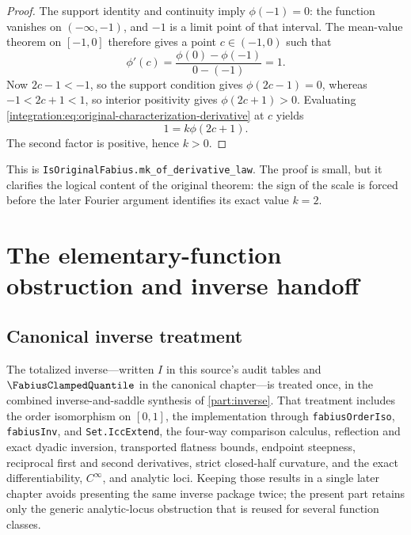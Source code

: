 \documentclass[11pt,oneside]{article}
\theoremstyle{definition}
\theoremstyle{remark}
\newcommand{\lean}[1]{%
  \ifmmode\text{\texttt{\detokenize{#1}}}\else\nolinkurl{#1}\fi}
\begin{document}
\begin{proof}
The support identity and continuity imply $\phi(-1)=0$: the function vanishes on
$(-\infty,-1)$, and $-1$ is a limit point of that interval.  The mean-value theorem on
$[-1,0]$ therefore gives a point $c\in(-1,0)$ such that
\begin{equation}
 \phi'(c)=\frac{\phi(0)-\phi(-1)}{0-(-1)}=1.
 \label{integration:eq:original-characterization-mvt}
\end{equation}
Now $2c-1<-1$, so the support condition gives $\phi(2c-1)=0$, whereas
$-1<2c+1<1$, so interior positivity gives $\phi(2c+1)>0$.  Evaluating
\eqref{integration:eq:original-characterization-derivative} at $c$ yields
\begin{equation}
 1=k\phi(2c+1).
 \label{integration:eq:original-characterization-positive-product}
\end{equation}
The second factor is positive, hence $k>0$.
\end{proof}

This is \lean{IsOriginalFabius.mk\_of\_derivative\_law}.  The proof is small, but it clarifies
the logical content of the original theorem: the sign of the scale is forced before the later
Fourier argument identifies its exact value $k=2$.

\section{The elementary-function obstruction and inverse handoff}

\subsection{Canonical inverse treatment}
\label{integration:sec:inverse}
\label{integration:sec:inverse-steepness}
The totalized inverse---written \(I\) in this source's audit tables and \(\FabiusClampedQuantile\) in the
canonical chapter---is treated once, in the combined inverse-and-saddle synthesis
of \cref{part:inverse}.  That treatment includes the order isomorphism on \([0,1]\),
the implementation through \nolinkurl{fabiusOrderIso}, \nolinkurl{fabiusInv}, and
\nolinkurl{Set.IccExtend}, the four-way comparison calculus, reflection and exact dyadic
inversion, transported flatness bounds, endpoint steepness, reciprocal first and second
derivatives, strict closed-half curvature, and the exact differentiability,
\(C^\infty\), and analytic loci.  Keeping those results in a single later chapter avoids
presenting the same inverse package twice; the present part retains only the generic
analytic-locus obstruction that is reused for several function classes.
\end{document}
